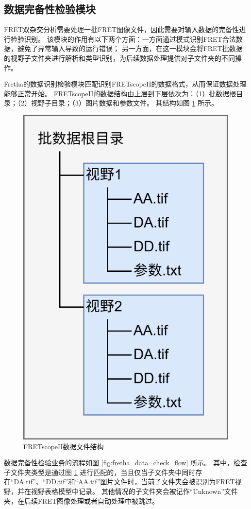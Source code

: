 \subsection{数据完备性检验模块}
\label{sec:数据完备性检验模块}

FRET双杂交分析需要处理一批FRET图像文件，因此需要对输入数据的完备性进行检验识别。
该模块的作用有以下两个方面：一方面通过模式识别FRET合法数据，避免了异常输入导致的运行错误；
另一方面，在这一模块会将FRET批数据的视野子文件夹进行解析和类型识别，为后续数据处理提供对子文件夹的不同操作。

Fretha的数据识别检验模块匹配识别FRETscopeII的数据格式，从而保证数据处理能够正常开始。
FRETscopeII的数据结构由上层到下层依次为：（1）批数据根目录；（2）视野子目录；（3）图片数据和参数文件。
其结构如图 \ref{fig:fretscope_data_struct} 所示。

\begin{figure}[htbp]
    \centering
    \includegraphics[height=0.5\linewidth]{../figures/2/2_FRETscopeII数据格式.drawio.png}
    \caption{FRETscopeII数据文件结构}
    \label{fig:fretscope_data_struct}
\end{figure}

数据完备性检验业务的流程如图 \ref{fig:fretha_data_check_flow} 所示。
其中，检查子文件夹类型是通过图 \ref{fig:fretscope_data_struct} 进行匹配的，当且仅当子文件夹中同时存在“DA.tif”、“DD.tif”和“AA.tif”图片文件时，当前子文件夹会被识别为FRET视野，并在视野表格模型中记录。
其他情况的子文件夹会被记作“Unknown”文件夹，在后续FRET图像处理或者自动处理中被跳过。

